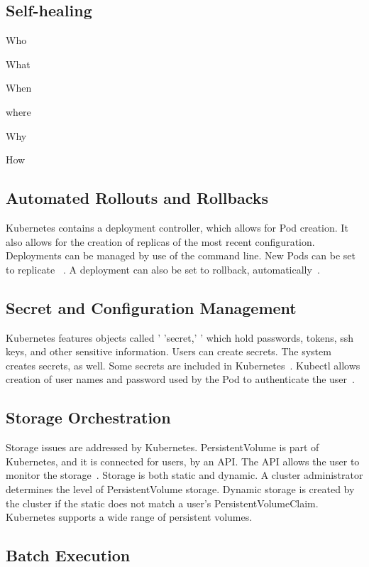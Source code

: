 \subsection{Self-healing}

Who

What  

When

where

Why

How


\subsection{Automated Rollouts and Rollbacks}

Kubernetes contains a deployment controller, which allows for Pod
creation.  It also allows for the creation of replicas of the most
recent configuration.  Deployments can be managed by use of the
command line.  New Pods can be set to replicate ~\cite{concept}. A
deployment can also be set to rollback, automatically~\cite{concept}.  

\subsection{Secret and Configuration Management}

Kubernetes features objects called ' 'secret,' ' which hold passwords,
tokens, ssh keys, and other sensitive information.  Users can create
secrets.  The system creates secrets, as well.  Some secrets are
included in Kubernetes~\cite{concept}.  Kubectl allows creation of
user names and password used by the Pod to authenticate the  
user~\cite{concept}.  

\subsection{Storage Orchestration}

Storage issues are addressed by Kubernetes.  PersistentVolume is part
of Kubernetes, and it is connected for users, by an API.  The API
allows the user to monitor the storage~\cite{concept}.  Storage is
both static and dynamic.  A cluster administrator determines the level
of PersistentVolume storage.  Dynamic storage is created by the
cluster if the static does not match a user's PersistentVolumeClaim.
Kubernetes supports a wide range of persistent volumes.    


\subsection{Batch Execution}

